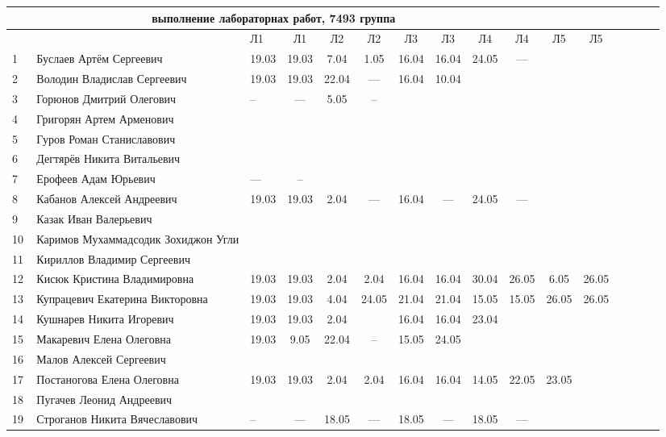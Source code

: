 \documentclass[a4paper,11pt]{article}
\begin{document}
%
\hspace{-6.1cm} %
\begin{tabular}{l|llccccccccccccc}
\multicolumn{10}{c}{выполнение лабораторнах работ, 7493 группа} \\
\toprule
&&Л1&Л1& Л2&Л2& Л3&Л3& Л4&Л4& Л5&Л5\\ 
\midrule
1\,&Буслаев Артём Сергеевич               &19.03&19.03& 7.04& 1.05&16.04&16.04&24.05& --- &&\\
2\,&Володин Владислав Сергеевич           &19.03&19.03&22.04& --- &16.04&10.04&&\\
3\,&Горюнов Дмитрий Олегович              &--   &---  & 5.05& --  &&&&\\
4\,&Григорян Артем Арменович              &&&&&&&&\\
5\,&Гуров Роман Станиславович             &&&&&&&&\\
\midrule
6\,&Дегтярёв Никита Витальевич            &&&&&&&&\\
7\,&Ерофеев Адам Юрьевич                  &---&--&&&&&&\\
8\,&Кабанов Алексей Андреевич             &19.03&19.03&2.04& --- &16.04& --- &24.05& ---\\
9\,&Казак Иван Валерьевич                 &&&&&&&&\\
10\,&Каримов Мухаммадсодик Зохиджон Угли  &&&&&&&&\\
\midrule
11\,&Кириллов Владимир Сергеевич          &&&&&&&&\\
12\,&Кисюк Кристина Владимировна          &19.03&19.03&2.04 &2.04&16.04&16.04 &30.04&26.05&6.05&26.05\\
13\,&Купрацевич Екатерина Викторовна      &19.03&19.03& 4.04&24.05&21.04&21.04&15.05&15.05&26.05&26.05\\
14\,&Кушнарев Никита Игоревич             &19.03&19.03& 2.04&     &16.04&16.04&23.04&\\
15\,&Макаревич Елена Олеговна             &19.03& 9.05&22.04& --  &15.05&24.05&&\\
\midrule
16\,&Малов Алексей Сергеевич              &&&&&&&&\\
17\,&Постаногова Елена Олеговна           &19.03&19.03&2.04&2.04&16.04&16.04&14.05&22.05&23.05\\
18\,&Пугачев Леонид Андреевич             &&&&&&&&\\
19\,&Строганов Никита Вячеславович        &--&---&18.05& --- &18.05& --- &18.05& ---\\

\bottomrule
\end{tabular}
\end{document}
